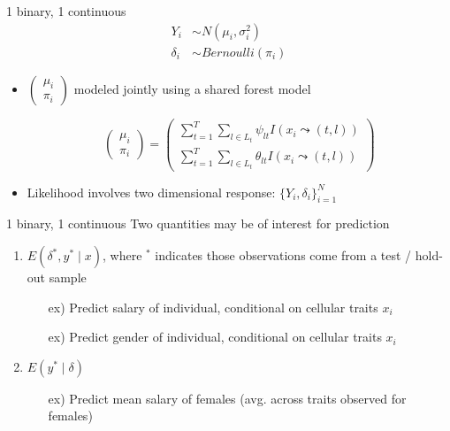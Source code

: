 \documentclass{beamer}
\begin{document}
\begin{frame}{1 binary, 1 continuous }
\begin{align}
Y_i &\sim N(\mu_i, \sigma^2_i) \\
\delta_i &\sim Bernoulli(\pi_i)
\end{align}

\begin{itemize}
\item $\begin{pmatrix}\mu_i \\ \pi_i \end{pmatrix}$ modeled jointly using a shared forest model

$$\begin{pmatrix}\mu_i \\ \pi_i \end{pmatrix} = 
\begin{pmatrix}\sum_{t=1}^T \sum_{l \in L_t}\psi_{lt}I(x_i \leadsto (t,l)) \\ \sum_{t=1}^T \sum_{l \in L_t}\theta_{lt}I(x_i \leadsto (t,l)) \end{pmatrix} $$
\item Likelihood involves two dimensional response: $\{Y_i, \delta_i\}_{i = 1}^N$
\end{itemize}
\end{frame}

\begin{frame}{1 binary, 1 continuous }
Two quantities may be of interest for prediction
\begin{enumerate}
\item $E(\delta^*, y^* \mid x)$, where $^*$ indicates those observations come from a test / hold-out sample
  \begin{itemize}
    \item[ex)] Predict salary of individual, conditional on cellular traits $x_i$
    \item[ex)] Predict gender of individual, conditional on cellular traits $x_i$
  \end{itemize}
\item $E(y^* \mid \delta)$
  \begin{itemize}
    \item[ex)] Predict mean salary of females (avg. across traits observed for females)
  \end{itemize}
\end{enumerate}
\end{frame}
\end{document}
